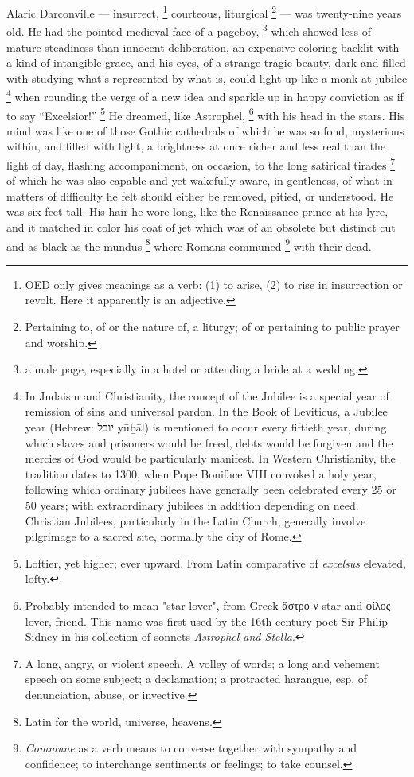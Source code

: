   Alaric Darconville --- insurrect, 
\footnote{\textdbend OED only gives meanings as a verb: (1) to arise, (2) to
rise in insurrection or revolt. Here it apparently is an adjective.}
courteous, liturgical
\footnote{Pertaining to, of or the nature of, a liturgy; of or pertaining to
public prayer and worship.}
--- was twenty-nine years old.
He had the pointed medieval face of a pageboy, 
\footnote{a male page, especially in a hotel or attending a bride at a wedding.}
which showed less of mature
steadiness than innocent deliberation, an expensive coloring backlit with a kind
of intangible grace, and his eyes, of a strange tragic beauty, dark and filled
with studying what’s represented by what is, could light up like a monk at
jubilee 
\footnote{In Judaism and Christianity, the concept of the Jubilee is a special
year of remission of sins and universal pardon. In the Book of Leviticus, a
Jubilee year (Hebrew: יובל‎‎ yūḇāl) is mentioned to occur every
fiftieth year, during which slaves and prisoners would be freed, debts would be
forgiven and the mercies of God would be particularly manifest.
In Western Christianity, the tradition dates to 1300, when Pope Boniface VIII
convoked a holy year, following which ordinary jubilees have generally been
celebrated every 25 or 50 years; with extraordinary jubilees in addition
depending on need. Christian Jubilees, particularly in the Latin Church,
generally involve pilgrimage to a sacred site, normally the city of Rome. 
}
when rounding the verge of a new idea and sparkle up in happy conviction
as if to say “Excelsior!” 
\footnote{Loftier, yet higher; ever upward. From Latin comparative of
\textit{excelsus} elevated, lofty.}
He dreamed, like Astrophel, 
\footnote{Probably intended to mean "star lover", from Greek ἄστρο-ν star 
and ϕίλος lover, friend. This name was first used by the 16th-century poet 
Sir Philip Sidney in his collection of sonnets \textit{Astrophel and Stella}.
}
with his head in the stars. His mind was like one of those Gothic 
cathedrals of which he was so fond,
mysterious within, and filled with light, a brightness at once richer and less
real than the light of day, flashing accompaniment, on occasion, to the long
satirical tirades 
\footnote{A long, angry, or violent speech. A volley of words; a long and
vehement speech on some subject; a declamation; a protracted harangue, esp. of
denunciation, abuse, or invective. 
}
of which he was also capable and yet wakefully aware, in
gentleness, of what in matters of difficulty he felt should either be removed,
pitied, or understood. He was six feet tall. His hair he wore long, like the
Renaissance prince at his lyre, and it matched in color his coat of jet which
was of an obsolete but distinct cut and as black as the mundus 
\footnote{Latin for the world, universe, heavens.}
where Romans communed 
\footnote{\textit{Commune} as a verb means to converse together with sympathy
and confidence; to interchange sentiments or feelings; to take counsel.}
with their dead.

